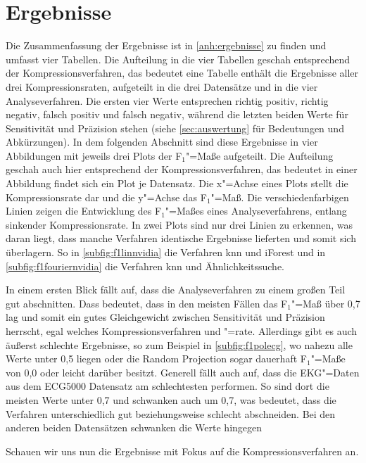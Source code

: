 \section{Ergebnisse}
Die Zusammenfassung der Ergebnisse ist in \autoref{anh:ergebnisse} zu finden und umfasst vier Tabellen. Die Aufteilung in die vier Tabellen geschah entsprechend der Kompressionsverfahren, das bedeutet eine Tabelle enthält die Ergebnisse aller drei Kompressionsraten, aufgeteilt in die drei Datensätze und in die vier Analyseverfahren. Die ersten vier Werte entsprechen richtig positiv, richtig negativ, falsch positiv und falsch negativ, während die letzten beiden Werte für Sensitivität und Präzision stehen (siehe \autoref{sec:auswertung} für Bedeutungen und Abkürzungen). In dem folgenden Abschnitt sind diese Ergebnisse in vier Abbildungen mit jeweils drei Plots der F$_1$"=Maße aufgeteilt. Die Aufteilung geschah auch hier entsprechend der Kompressionsverfahren, das bedeutet in einer Abbildung findet sich ein Plot je Datensatz. Die x"=Achse eines Plots stellt die Kompressionsrate dar und die y"=Achse das F$_1$"=Maß. Die verschiedenfarbigen Linien zeigen die Entwicklung des F$_1$"=Maßes eines Analyseverfahrens, entlang sinkender Kompressionsrate. In zwei Plots sind nur drei Linien zu erkennen, was daran liegt, dass manche Verfahren identische Ergebnisse lieferten und somit sich überlagern. So in \autoref{subfig:f1linnvidia} die Verfahren knn und iForest und in \autoref{subfig:f1fouriernvidia} die Verfahren knn und Ähnlichkeitssuche.

In einem ersten Blick fällt auf, dass die Analyseverfahren zu einem großen Teil gut abschnitten. Dass bedeutet, dass in den meisten Fällen das F$_1$"=Maß über 0,7 lag und somit ein gutes Gleichgewicht zwischen Sensitivität und Präzision herrscht, egal welches Kompressionsverfahren und "=rate. Allerdings gibt es auch äußerst schlechte Ergebnisse, so zum Beispiel in \autoref{subfig:f1polecg}, wo nahezu alle Werte unter 0,5 liegen oder die Random Projection sogar dauerhaft F$_1$"=Maße von 0,0 oder leicht darüber besitzt. Generell fällt auch auf, dass die EKG"=Daten aus dem ECG5000 Datensatz am schlechtesten performen. So sind dort die meisten Werte unter 0,7 und schwanken auch um 0,7, was bedeutet, dass die Verfahren unterschiedlich gut beziehungsweise schlecht abschneiden. Bei den anderen beiden Datensätzen schwanken die Werte hingegen 

Schauen wir uns nun die Ergebnisse mit Fokus auf die Kompressionsverfahren an.


